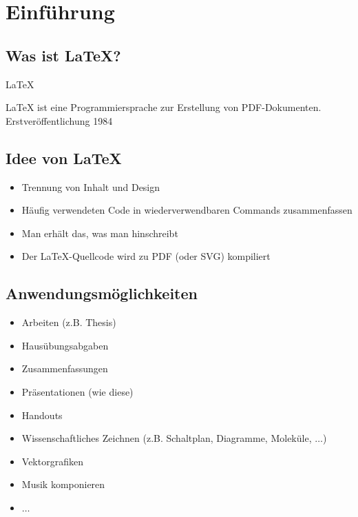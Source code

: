 \documentclass[
    ngerman,
    accentcolor=3b,
    dark_mode,
    fontsize= 12pt,
    a4paper,
    aspectratio=169,
    colorback=true,
    fancy_row_colors,
    leqno,
    fleqn,
    boxarc=3pt,
    fleqn,
]{algoslides}
\begin{document}
    \section{Einführung}\label{1}\label{Einfuehrung}
    \subsection{Was ist \LaTeX?}\label{1.1}\label{1.1}
    \begin{frame}[c]
        \slidehead{}
        \centering\fontsize{40pt}{45pt}\selectfont\LaTeX

        \medskip\normalsize{}

        \vfill
        LaTeX ist eine Programmiersprache zur Erstellung von PDF-Dokumenten. Erstveröffentlichung 1984
    \end{frame}
    \subsection{Idee von \LaTeX}\label{1.2}\label{1.2}
    \begin{frame}
        \slidehead{}
        \begin{itemize}
            \item Trennung von Inhalt und Design
            \item Häufig verwendeten Code in wiederverwendbaren Commands zusammenfassen
            \item Man erhält  das, was man hinschreibt
            \item Der \LaTeX-Quellcode wird zu PDF (oder SVG) kompiliert
        \end{itemize}
    \end{frame}
    \subsection{Anwendungsmöglichkeiten}
    \begin{frame}
        \slidehead{}
        \begin{itemize}
            \item Arbeiten (z.B. Thesis)
            \item Hausübungsabgaben
            \item Zusammenfassungen
            \item Präsentationen (wie diese)
            \item Handouts
            \item Wissenschaftliches Zeichnen (z.B. Schaltplan, Diagramme, Moleküle, $\dots$)
            \item Vektorgrafiken
            \item Musik komponieren
            \item $\dots$
        \end{itemize}
    \end{frame}
\end{document}
